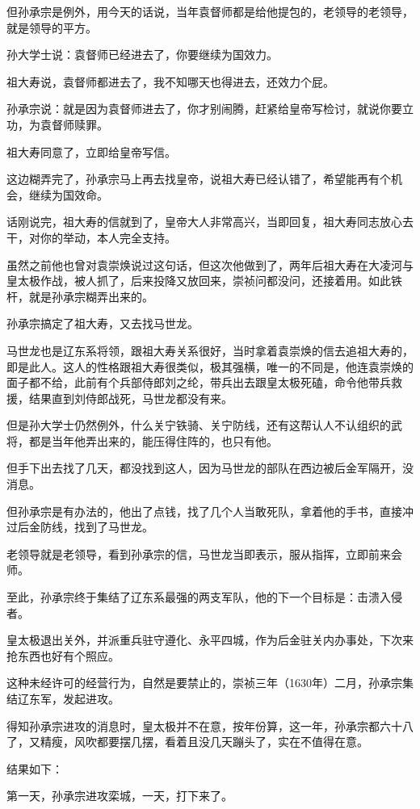 \begin{multicols}{\theparacolNo}
		但孙承宗是例外，用今天的话说，当年袁督师都是给他提包的，老领导的老领导，就是领导的平方。

		孙大学士说：袁督师已经进去了，你要继续为国效力。

		祖大寿说，袁督师都进去了，我不知哪天也得进去，还效力个屁。

		孙承宗说：就是因为袁督师进去了，你才别闹腾，赶紧给皇帝写检讨，就说你要立功，为袁督师赎罪。

		祖大寿同意了，立即给皇帝写信。

		这边糊弄完了，孙承宗马上再去找皇帝，说祖大寿已经认错了，希望能再有个机会，继续为国效命。

		话刚说完，祖大寿的信就到了，皇帝大人非常高兴，当即回复，祖大寿同志放心去干，对你的举动，本人完全支持。

		虽然之前他也曾对袁崇焕说过这句话，但这次他做到了，两年后祖大寿在大凌河与皇太极作战，被人抓了，后来投降又放回来，崇祯问都没问，还接着用。如此铁杆，就是孙承宗糊弄出来的。

		孙承宗搞定了祖大寿，又去找马世龙。

		马世龙也是辽东系将领，跟祖大寿关系很好，当时拿着袁崇焕的信去追祖大寿的，即是此人。这人的性格跟祖大寿很类似，极其强横，唯一的不同是，他连袁崇焕的面子都不给，此前有个兵部侍郎刘之纶，带兵出去跟皇太极死磕，命令他带兵救援，结果直到刘侍郎战死，马世龙都没有来。

		但是孙大学士仍然例外，什么关宁铁骑、关宁防线，还有这帮认人不认组织的武将，都是当年他弄出来的，能压得住阵的，也只有他。

		但手下出去找了几天，都没找到这人，因为马世龙的部队在西边被后金军隔开，没消息。

		但孙承宗是有办法的，他出了点钱，找了几个人当敢死队，拿着他的手书，直接冲过后金防线，找到了马世龙。

		老领导就是老领导，看到孙承宗的信，马世龙当即表示，服从指挥，立即前来会师。

		至此，孙承宗终于集结了辽东系最强的两支军队，他的下一个目标是：击溃入侵者。

		皇太极退出关外，并派重兵驻守遵化、永平四城，作为后金驻关内办事处，下次来抢东西也好有个照应。

		这种未经许可的经营行为，自然是要禁止的，崇祯三年（1630年）二月，孙承宗集结辽东军，发起进攻。

		得知孙承宗进攻的消息时，皇太极并不在意，按年份算，这一年，孙承宗都六十八了，又精瘦，风吹都要摆几摆，看着且没几天蹦头了，实在不值得在意。

		结果如下：

		第一天，孙承宗进攻栾城，一天，打下来了。


\end{multicols}
